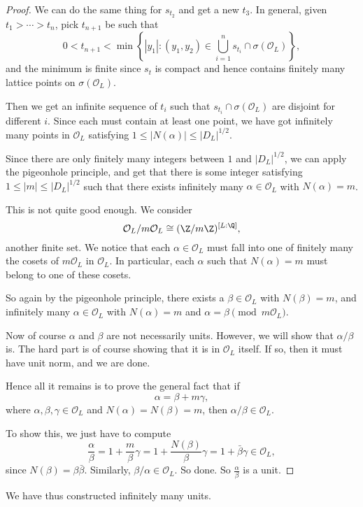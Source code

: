 \documentclass[a4paper]{article}
\begin{document}
\begin{proof}
  We can do the same thing for $s_{t_2}$ and get a new $t_3$. In general, given $t_1 > \cdots > t_n$, pick $t_{n + 1}$ be such that
  \[
    0 < t_{n + 1} < \min\left\{|y_1|: (y_1, y_2) \in \bigcup_{i = 1}^n s_{t_i} \cap \sigma(\mathcal{O}_L)\right\},
  \]
  and the minimum is finite since $s_t$ is compact and hence contains finitely many lattice points on $\sigma(\mathcal{O}_L)$.

  Then we get an infinite sequence of $t_i$ such that $s_{t_i} \cap \sigma(\mathcal{O}_L)$ are disjoint for different $i$. Since each must contain at least one point, we have got infinitely many points in $\mathcal{O}_L$ satisfying $1 \leq |N(\alpha)| \leq |D_L|^{1/2}$.

  Since there are only finitely many integers between $1$ and $|D_L|^{1/2}$, we can apply the pigeonhole principle, and get that there is some integer satisfying $1 \leq |m| \leq |D_L|^{1/2}$ such that there exists infinitely many $\alpha \in \mathcal{O}_L$ with $N(\alpha) = m$.

  This is not quite good enough. We consider
  \[
    \mathcal{O}_L/m\mathcal{O}_L \cong (\Z/m\Z)^{[L:\Q]},
  \]
  another finite set. We notice that each $\alpha \in \mathcal{O}_L$ must fall into one of finitely many the cosets of $m\mathcal{O}_L$ in $\mathcal{O}_L$. In particular, each $\alpha$ such that $N(\alpha) = m$ must belong to one of these cosets.

  So again by the pigeonhole principle, there exists a $\beta \in \mathcal{O}_L$ with $N(\beta) = m$, and infinitely many $\alpha \in \mathcal{O}_L$ with $N(\alpha) = m$ and $\alpha = \beta \pmod {m\mathcal{O}_L}$.

  Now of course $\alpha$ and $\beta$ are not necessarily units. However, we will show that $\alpha/\beta$ is. The hard part is of course showing that it is in $\mathcal{O}_L$ itself. If so, then it must have unit norm, and we are done.

  Hence all it remains is to prove the general fact that if
  \[
    \alpha = \beta + m\gamma,
  \]
  where $\alpha, \beta, \gamma \in \mathcal{O}_L$ and $N(\alpha) = N(\beta) = m$, then $\alpha/\beta \in \mathcal{O}_L$.

  To show this, we just have to compute
  \[
    \frac{\alpha}{\beta} = 1 + \frac{m}{\beta}\gamma = 1 + \frac{N(\beta)}{\beta}\gamma = 1 + \bar{\beta} \gamma \in \mathcal{O}_L,
  \]
  since $N(\beta) = \beta\bar{\beta}$. Similarly, $\beta/\alpha \in \mathcal{O}_L$. So done. So $\frac{\alpha}{\beta}$ is a unit.
\end{proof}
We have thus constructed infinitely many units.
\end{document}
